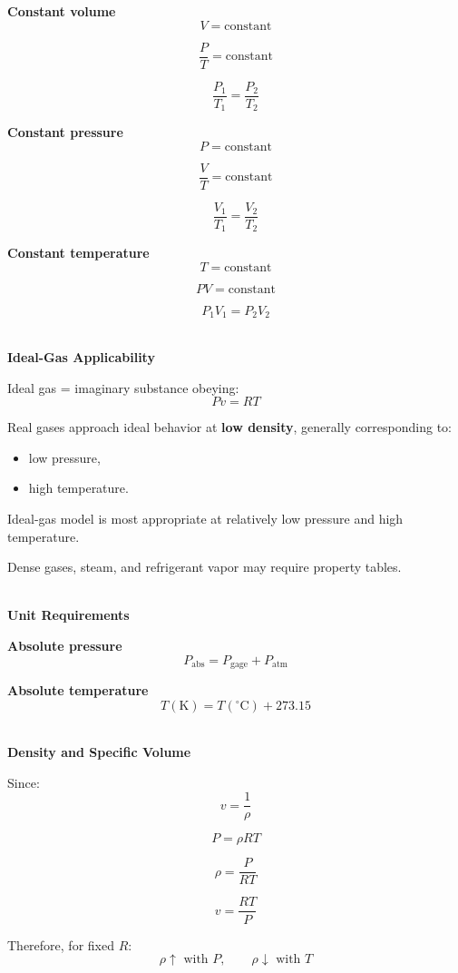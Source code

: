 \documentclass[12pt]{article}
\begin{document}
\textbf{Constant volume}
\[
V=\text{constant}
\]

\[
\boxed{\frac{P}{T}=\text{constant}}
\]

\[
\boxed{\frac{P_1}{T_1}=\frac{P_2}{T_2}}
\]

\textbf{Constant pressure}
\[
P=\text{constant}
\]

\[
\boxed{\frac{V}{T}=\text{constant}}
\]

\[
\boxed{\frac{V_1}{T_1}=\frac{V_2}{T_2}}
\]

\textbf{Constant temperature}
\[
T=\text{constant}
\]

\[
\boxed{PV=\text{constant}}
\]

\[
\boxed{P_1V_1=P_2V_2}
\]

\textbf{\\ Ideal-Gas Applicability}

Ideal gas = imaginary substance obeying:
\[
\boxed{Pv=RT}
\]

Real gases approach ideal behavior at \textbf{low density}, generally corresponding to:
\begin{itemize}[leftmargin=*]
    \item low pressure,
    \item high temperature.
\end{itemize}

Ideal-gas model is most appropriate at relatively low pressure and high temperature.

Dense gases, steam, and refrigerant vapor may require property tables.

\textbf{\\ Unit Requirements}

\textbf{Absolute pressure}
\[
\boxed{
P_{\mathrm{abs}}
=
P_{\mathrm{gage}}+P_{\mathrm{atm}}
}
\]

\textbf{Absolute temperature}
\[
\boxed{
T(\mathrm{K})
=
T(^\circ\mathrm{C})+273.15
}
\]

\textbf{\\ Density and Specific Volume}

Since:
\[
\boxed{v=\frac{1}{\rho}}
\]

\[
\boxed{P=\rho RT}
\]

\[
\boxed{\rho=\frac{P}{RT}}
\]

\[
\boxed{v=\frac{RT}{P}}
\]

Therefore, for fixed $R$:
\[
\boxed{
\rho\uparrow\text{ with }P,
\qquad
\rho\downarrow\text{ with }T
}
\]
\end{document}
